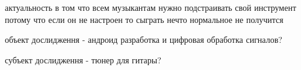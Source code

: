 
актуальность в том что всем музыкантам нужно подстраивать свой инструмент потому что если он не настроен то сыграть нечто нормальное не получится

объект дослидження - андроид разработка и цифровая обработка сигналов?

субъект дослидження - тюнер для гитары?